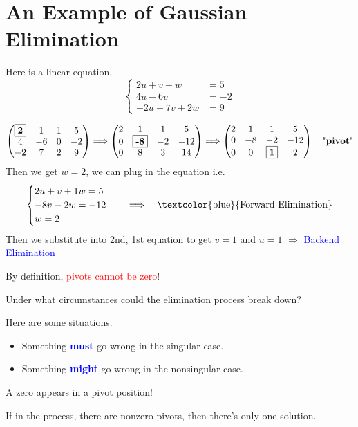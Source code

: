 \section{An Example of Gaussian Elimination}

\begin{eg}
Here is a linear equation.
\[
\begin{cases}
    2u + v + w &= 5\\
    4u - 6v &= -2\\
    -2u + 7v + 2w &= 9
\end{cases}
\]  
\end{eg}

\[
\left(
\begin{matrix}
    \boxed{\textbf{2}} & 1 & 1 & 5 \\
    4 & -6 & 0 & -2 \\
    -2 & 7 & 2 & 9
\end{matrix}
\right)
\Longrightarrow
\left(
\begin{matrix}
    2 & 1 & 1 & 5 \\
    0 & \boxed{\textbf{-8}} & -2 & -12 \\
    0 & 8 & 3 & 14
\end{matrix}
\right)
\Longrightarrow
\left(
\begin{matrix}
    2 & 1 & 1 & 5 \\
    0 & -8 & -2 & -12 \\
    0 & 0 & \boxed{\textbf{1}} & 2
\end{matrix}
\right)
\quad \text{"\textbf{pivot}"}
\]
Then we get \(w=2\), we can plug in the equation
i.e.
\[
\begin{cases}
    2u + v + 1w = 5 \\
      -8v  -2w = -12 \\
       w= 2
\end{cases}\quad \Longrightarrow \quad \text{\textcolor{blue}{Forward Elimination}}
\]
Then we substitute into 2nd, 1st equation to get \(v=1\) and \(u=1\) \(
\Longrightarrow
\) \textcolor{blue}{Backend Elimination}

\begin{note}
    By definition, \textcolor{red}{pivots cannot be zero}!
\end{note}

\begin{exercise}
    Under what circumstances could the elimination process break down?
\end{exercise}
\begin{answer}
    Here are some situations.
    \begin{itemize}
        \item Something \textcolor{blue}{\textbf{must}} go wrong in the singular case.
        \item Something \textcolor{blue}{\textbf{might}} go wrong in the nonsingular case.
    \end{itemize}

    A zero appears in a pivot position! 
    
    If in the process, there are nonzero pivots, then there's only one solution.
\end{answer}

